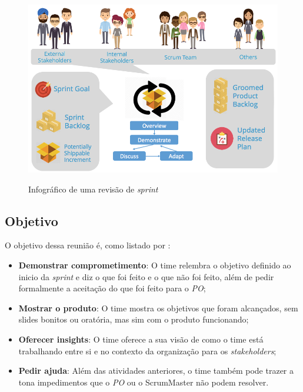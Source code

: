 \documentclass{iiufrgs}
\begin{document}
\begin{figure}[htbp]
    \centering
    \caption{Infográfico de uma revisão de \textit{sprint}}
    \includegraphics[scale=0.4]{images/sprint-review.png}
    \label{fig:revisao}
\end{figure}

\subsection{Objetivo}

O objetivo dessa reunião é, como listado por \citet{Adkins2010Coaching}:

\begin{itemize}[leftmargin=3em, noitemsep, nosep, before=\vspace{1cm}, after=\vspace{1cm}]
    \setlength{\itemindent}{1em}
    \item \textbf{Demonstrar comprometimento}: O time relembra o objetivo definido ao inicio da \textit{sprint} e diz o que foi feito e o que não foi feito, além de pedir formalmente a aceitação do que foi feito para o \textit{PO};
    \item \textbf{Mostrar o produto}: O time mostra os objetivos que foram alcançados, sem slides bonitos ou oratória, mas sim com o produto funcionando;
    \item \textbf{Oferecer insights}: O time oferece a sua visão de como o time está trabalhando entre si e no contexto da organização para os \textit{stakeholders};
    \item \textbf{Pedir ajuda}: Além das atividades anteriores, o time também pode trazer a tona impedimentos que o \textit{PO} ou o ScrumMaster não podem resolver.
\end{itemize}
\end{document}
